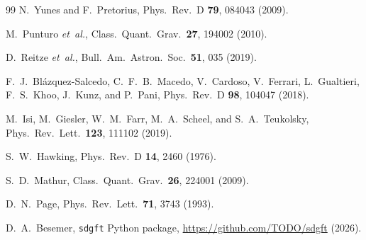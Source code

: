 \documentclass[amsmath,amssymb,aps,prd,twocolumn,superscriptaddress,nofootinbib]{revtex4-2}
\begin{document}
\begin{thebibliography}{99}
N.~Yunes and F.~Pretorius,
Phys.\ Rev.\ D \textbf{79}, 084043 (2009).

M.~Punturo {\it et~al.},
Class.\ Quant.\ Grav.\ \textbf{27}, 194002 (2010).

D.~Reitze {\it et~al.},
Bull.\ Am.\ Astron.\ Soc.\ \textbf{51}, 035 (2019).

F.~J.~Bl{\'a}zquez-Salcedo, C.~F.~B.~Macedo, V.~Cardoso, V.~Ferrari,
L.~Gualtieri, F.~S.~Khoo, J.~Kunz, and P.~Pani,
Phys.\ Rev.\ D \textbf{98}, 104047 (2018).

M.~Isi, M.~Giesler, W.~M.~Farr, M.~A.~Scheel, and S.~A.~Teukolsky,
Phys.\ Rev.\ Lett.\ \textbf{123}, 111102 (2019).

S.~W.~Hawking,
Phys.\ Rev.\ D \textbf{14}, 2460 (1976).

S.~D.~Mathur,
Class.\ Quant.\ Grav.\ \textbf{26}, 224001 (2009).

D.~N.~Page,
Phys.\ Rev.\ Lett.\ \textbf{71}, 3743 (1993).

D.~A.~Besemer, \texttt{sdgft} Python package,
\url{https://github.com/TODO/sdgft} (2026).

\end{thebibliography}
\end{document}
